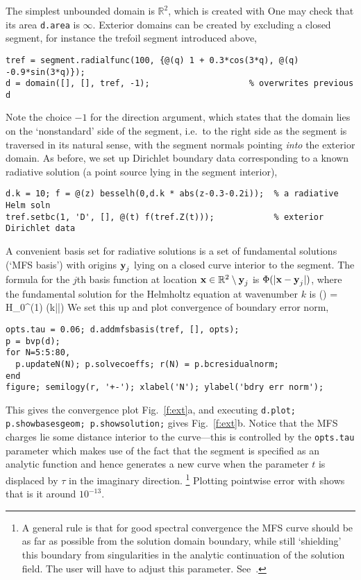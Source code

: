 The simplest unbounded domain is $\mathbb{R}^2$, which is created with
One may check that its area {\tt d.area} is $\infty$.
Exterior domains can be created by excluding a closed segment, for instance
the trefoil segment introduced above,
\begin{verbatim}
tref = segment.radialfunc(100, {@(q) 1 + 0.3*cos(3*q), @(q) -0.9*sin(3*q)});
d = domain([], [], tref, -1);                    % overwrites previous d
\end{verbatim}
Note the choice $-1$ for the direction argument, which states that
the domain lies on the `nonstandard' side of the segment, i.e.\
to the right side as the segment is traversed in its natural sense,
with the segment normals pointing {\em into} the exterior domain.
As before, we set up Dirichlet boundary data corresponding to a known
radiative solution (a point source lying in the segment interior),
\begin{verbatim}
d.k = 10; f = @(z) besselh(0,d.k * abs(z-0.3-0.2i));  % a radiative Helm soln
tref.setbc(1, 'D', [], @(t) f(tref.Z(t)));            % exterior Dirichlet data
\end{verbatim}
A convenient basis set for radiative solutions is a set of fundamental
solutions (`MFS basis') with origins $\textbf{y}_j$
lying on a closed curve interior to the segment.
The formula for the $j$th basis function at location
$\textbf{x}\in\mathbb{R}^2\setminus \textbf{y}_j$
is $\Phi(|\textbf{x}-\textbf{y}_j|)$, where
the fundamental solution for the Helmholtz equation at wavenumber $k$ is
\be
        \Phi(\bx) = H_0^{(1)} (k|\bx|)
\label{e:fund}
\ee
We set this up and plot convergence of boundary error norm,
\begin{verbatim}
opts.tau = 0.06; d.addmfsbasis(tref, [], opts);
p = bvp(d);
for N=5:5:80,
  p.updateN(N); p.solvecoeffs; r(N) = p.bcresidualnorm;
end
figure; semilogy(r, '+-'); xlabel('N'); ylabel('bdry err norm');
\end{verbatim}
This gives the convergence plot Fig.~\ref{f:ext}a, and
executing {\tt d.plot; p.showbasesgeom; p.showsolution;} gives
Fig.~\ref{f:ext}b. Notice that the MFS charges lie some distance interior
to the curve---this is controlled by the {\tt opts.tau} parameter which
makes use of the fact that the segment is specified as an analytic function
and hence generates a new curve when the parameter $t$ is displaced
by $\tau$ in the imaginary direction.%
  \footnote{A general rule is that for good spectral convergence
    the MFS curve should be
    as far as possible from the solution domain boundary, while still
    `shielding' this boundary from singularities in the analytic continuation
    of the solution field. The user will have to adjust this parameter.
    See~\cite{mfs}.}
Plotting pointwise error with
shows that is it around $10^{-13}$.


